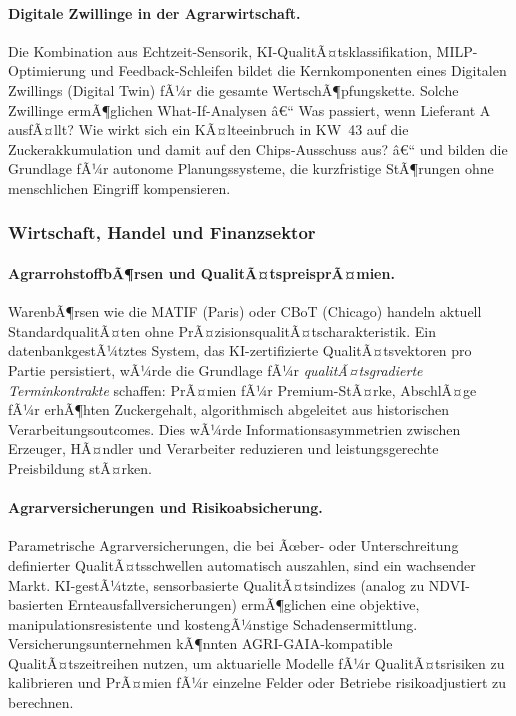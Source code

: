 ﻿\documentclass[12pt,a4paper]{article}
\theoremstyle{plain}
\theoremstyle{definition}
\begin{document}
	\paragraph{Digitale Zwillinge in der Agrarwirtschaft.}
	Die Kombination aus Echtzeit-Sensorik, KI-QualitÃ¤tsklassifikation,
	MILP-Optimierung und Feedback-Schleifen bildet die Kernkomponenten
	eines Digitalen Zwillings (Digital Twin) fÃ¼r die gesamte
	WertschÃ¶pfungskette. Solche Zwillinge ermÃ¶glichen What-If-Analysen â€“
	Was passiert, wenn Lieferant A ausfÃ¤llt? Wie wirkt sich ein
	KÃ¤lteeinbruch in KW~43 auf die Zuckerakkumulation und damit auf den
	Chips-Ausschuss aus? â€“ und bilden die Grundlage fÃ¼r autonome
	Planungssysteme, die kurzfristige StÃ¶rungen ohne menschlichen
	Eingriff kompensieren.

	\subsubsection{Wirtschaft, Handel und Finanzsektor}

	\paragraph{AgrarrohstoffbÃ¶rsen und QualitÃ¤tspreisprÃ¤mien.}
	WarenbÃ¶rsen wie die MATIF (Paris) oder CBoT (Chicago) handeln aktuell
	StandardqualitÃ¤ten ohne PrÃ¤zisionsqualitÃ¤tscharakteristik. Ein
	datenbankgestÃ¼tztes System, das KI-zertifizierte QualitÃ¤tsvektoren
	pro Partie persistiert, wÃ¼rde die Grundlage fÃ¼r \emph{qualitÃ¤tsgradierte
	Terminkontrakte} schaffen: PrÃ¤mien fÃ¼r Premium-StÃ¤rke, AbschlÃ¤ge fÃ¼r
	erhÃ¶hten Zuckergehalt, algorithmisch abgeleitet aus historischen
	Verarbeitungsoutcomes. Dies wÃ¼rde Informationsasymmetrien zwischen
	Erzeuger, HÃ¤ndler und Verarbeiter reduzieren und leistungsgerechte
	Preisbildung stÃ¤rken.

	\paragraph{Agrarversicherungen und Risikoabsicherung.}
	Parametrische Agrarversicherungen, die bei Ãœber- oder Unterschreitung
	definierter QualitÃ¤tsschwellen automatisch auszahlen, sind ein
	wachsender Markt. KI-gestÃ¼tzte, sensorbasierte QualitÃ¤tsindizes
	(analog zu NDVI-basierten Ernteausfallversicherungen) ermÃ¶glichen
	eine objektive, manipulationsresistente und kostengÃ¼nstige
	Schadensermittlung. Versicherungsunternehmen kÃ¶nnten
	AGRI-GAIA-kompatible QualitÃ¤tszeitreihen nutzen, um aktuarielle
	Modelle fÃ¼r QualitÃ¤tsrisiken zu kalibrieren und PrÃ¤mien
	fÃ¼r einzelne Felder oder Betriebe risikoadjustiert zu berechnen.
\end{document}

